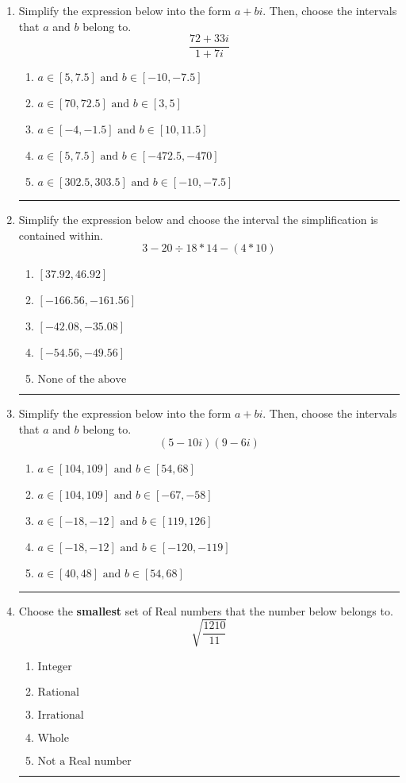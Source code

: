 \documentclass[14pt]{extbook}
\newcommand{\litem}[1]{\item#1\hspace*{-1cm}\rule{\textwidth}{0.4pt}}
\begin{document}
\begin{enumerate}
{\begin{enumerate}[label=\Alph*.]
\end{enumerate} }
\litem{
Simplify the expression below into the form $a+bi$. Then, choose the intervals that $a$ and $b$ belong to.\[ \frac{72 + 33 i}{1 + 7 i} \]\begin{enumerate}[label=\Alph*.]
\item \( a \in [5, 7.5] \text{ and } b \in [-10, -7.5] \)
\item \( a \in [70, 72.5] \text{ and } b \in [3, 5] \)
\item \( a \in [-4, -1.5] \text{ and } b \in [10, 11.5] \)
\item \( a \in [5, 7.5] \text{ and } b \in [-472.5, -470] \)
\item \( a \in [302.5, 303.5] \text{ and } b \in [-10, -7.5] \)

\end{enumerate} }
\litem{
Simplify the expression below and choose the interval the simplification is contained within.\[ 3 - 20 \div 18 * 14 - (4 * 10) \]\begin{enumerate}[label=\Alph*.]
\item \( [37.92, 46.92] \)
\item \( [-166.56, -161.56] \)
\item \( [-42.08, -35.08] \)
\item \( [-54.56, -49.56] \)
\item \( \text{None of the above} \)

\end{enumerate} }
\litem{
Simplify the expression below into the form $a+bi$. Then, choose the intervals that $a$ and $b$ belong to.\[ (5 - 10 i)(9 - 6 i) \]\begin{enumerate}[label=\Alph*.]
\item \( a \in [104, 109] \text{ and } b \in [54, 68] \)
\item \( a \in [104, 109] \text{ and } b \in [-67, -58] \)
\item \( a \in [-18, -12] \text{ and } b \in [119, 126] \)
\item \( a \in [-18, -12] \text{ and } b \in [-120, -119] \)
\item \( a \in [40, 48] \text{ and } b \in [54, 68] \)

\end{enumerate} }
\litem{
Choose the \textbf{smallest} set of Real numbers that the number below belongs to.\[ \sqrt{\frac{1210}{11}} \]\begin{enumerate}[label=\Alph*.]
\item \( \text{Integer} \)
\item \( \text{Rational} \)
\item \( \text{Irrational} \)
\item \( \text{Whole} \)
\item \( \text{Not a Real number} \)


\end{enumerate}}
\end{enumerate}
\end{document}
